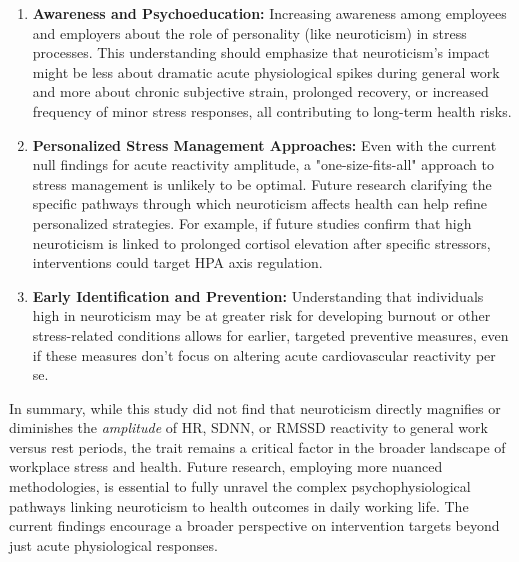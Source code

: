 \documentclass[11pt, a4paper]{report}
\begin{document}
\begin{enumerate}
\begin{itemize}
        \end{itemize}
    \item \textbf{Awareness and Psychoeducation:}
        Increasing awareness among employees and employers about the role of personality (like neuroticism) in stress processes. This understanding should emphasize that neuroticism's impact might be less about dramatic acute physiological spikes during general work and more about chronic subjective strain, prolonged recovery, or increased frequency of minor stress responses, all contributing to long-term health risks.
    \item \textbf{Personalized Stress Management Approaches:}
        Even with the current null findings for acute reactivity amplitude, a "one-size-fits-all" approach to stress management is unlikely to be optimal. Future research clarifying the specific pathways through which neuroticism affects health can help refine personalized strategies. For example, if future studies confirm that high neuroticism is linked to prolonged cortisol elevation after specific stressors, interventions could target HPA axis regulation.
    \item \textbf{Early Identification and Prevention:}
        Understanding that individuals high in neuroticism may be at greater risk for developing burnout \cite{Bianchi2018} or other stress-related conditions allows for earlier, targeted preventive measures, even if these measures don't focus on altering acute cardiovascular reactivity per se.
\end{enumerate}
In summary, while this study did not find that neuroticism directly magnifies or diminishes the \textit{amplitude} of HR, SDNN, or RMSSD reactivity to general work versus rest periods, the trait remains a critical factor in the broader landscape of workplace stress and health. Future research, employing more nuanced methodologies, is essential to fully unravel the complex psychophysiological pathways linking neuroticism to health outcomes in daily working life. The current findings encourage a broader perspective on intervention targets beyond just acute physiological responses.

\cleardoublepage %

\end{document}
